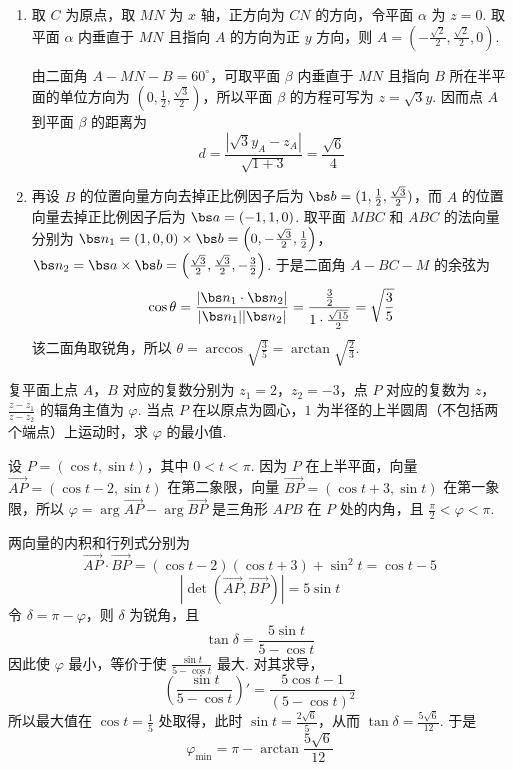 \documentclass[UTF8,a4paper,oneside,11pt]{ctexbook}
\begin{document}
\begin{solution}
\begin{enumerate}
\item
取 \(C\) 为原点，取 \(MN\) 为 \(x\) 轴，正方向为 \(CN\) 的方向，令平面 \(\alpha\) 为 \(z=0\). 取平面 \(\alpha\) 内垂直于 \(MN\) 且指向 \(A\) 的方向为正 \(y\) 方向，则
\(A=(-\frac{\sqrt2}{2},\frac{\sqrt2}{2},0)\).

由二面角 \(A-MN-B=60^\circ\)，可取平面 \(\beta\) 内垂直于 \(MN\) 且指向 \(B\) 所在半平面的单位方向为 \((0,\frac12,\frac{\sqrt3}{2})\)，所以平面 \(\beta\) 的方程可写为 \(z=\sqrt3y\). 因而点 \(A\) 到平面 \(\beta\) 的距离为
\[
d=\frac{|\sqrt3y_A-z_A|}{\sqrt{1+3}}=\frac{\sqrt6}{4}
\]

\item
再设 \(B\) 的位置向量方向去掉正比例因子后为 \(\bs b=(1,\frac12,\frac{\sqrt3}{2})\)，而 \(A\) 的位置向量去掉正比例因子后为 \(\bs a=(-1,1,0)\). 取平面 \(MBC\) 和 \(ABC\) 的法向量分别为
\(\bs n_1=(1,0,0)\times\bs b=\left(0,-\frac{\sqrt3}{2},\frac12\right)\)，
\(\bs n_2=\bs a\times\bs b=\left(\frac{\sqrt3}{2},\frac{\sqrt3}{2},-\frac32\right)\).
于是二面角 \(A-BC-M\) 的余弦为
\[
\cos\theta=\frac{|\bs n_1\cdot\bs n_2|}{|\bs n_1||\bs n_2|}=\frac{\frac32}{1\cdot\frac{\sqrt{15}}2}=\sqrt{\frac35}
\]
该二面角取锐角，所以
\(\theta=\arccos\sqrt{\frac35}=\arctan\sqrt{\frac23}\).
\end{enumerate}
\end{solution}

\begin{problem}
复平面上点 \(A\)，\(B\) 对应的复数分别为 \(z_1=2\)，\(z_2=-3\)，点 \(P\) 对应的复数为 \(z\)，\(\frac{z-z_1}{z-z_2}\) 的辐角主值为 \(\varphi\). 当点 \(P\) 在以原点为圆心，\(1\) 为半径的上半圆周（不包括两个端点）上运动时，求 \(\varphi\) 的最小值.
\end{problem}

\begin{solution}
设 \(P=(\cos t,\sin t)\)，其中 \(0<t<\pi\). 因为 \(P\) 在上半平面，向量 \(\overrightarrow{AP}=(\cos t-2,\sin t)\) 在第二象限，向量 \(\overrightarrow{BP}=(\cos t+3,\sin t)\) 在第一象限，所以
\(\varphi=\arg\overrightarrow{AP}-\arg\overrightarrow{BP}\) 是三角形 \(APB\) 在 \(P\) 处的内角，且 \(\frac\pi2<\varphi<\pi\).

两向量的内积和行列式分别为
\[
\overrightarrow{AP}\cdot\overrightarrow{BP}=(\cos t-2)(\cos t+3)+\sin^2t=\cos t-5
\]
\[
\left|\det(\overrightarrow{AP},\overrightarrow{BP})\right|=5\sin t
\]
令 \(\delta=\pi-\varphi\)，则 \(\delta\) 为锐角，且
\[
\tan\delta=\frac{5\sin t}{5-\cos t}
\]
因此使 \(\varphi\) 最小，等价于使 \(\frac{\sin t}{5-\cos t}\) 最大. 对其求导，
\[
\left(\frac{\sin t}{5-\cos t}\right)'=\frac{5\cos t-1}{(5-\cos t)^2}
\]
所以最大值在 \(\cos t=\frac15\) 处取得，此时 \(\sin t=\frac{2\sqrt6}{5}\)，从而
\(\tan\delta=\frac{5\sqrt6}{12}\). 于是
\[
\varphi_{\min}=\pi-\arctan\frac{5\sqrt6}{12}
\]
\end{solution}

\end{document}
